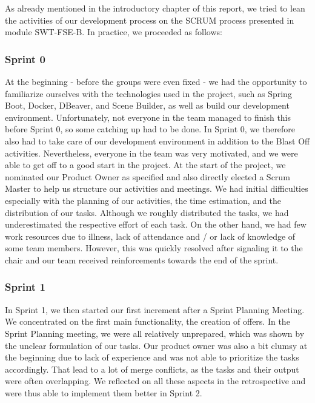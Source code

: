 As already mentioned in the introductory chapter of this report, we tried to lean the activities of our development process on the SCRUM process presented in module SWT-FSE-B.
In practice, we proceeded as follows:
\subsubsection{Sprint 0}
At the beginning - before the groups were even fixed - we had the opportunity to familiarize ourselves with the technologies used in the project, such as Spring Boot, Docker, DBeaver, and Scene Builder, as well as build our development environment.
Unfortunately, not everyone in the team managed to finish this before Sprint 0, so some catching up had to be done.
In Sprint 0, we therefore also had to take care of our development environment in addition to the Blast Off activities.
Nevertheless, everyone in the team was very motivated, and we were able to get off to a good start in the project.
    At the start of the project, we nominated our Product Owner as specified and also directly elected a Scrum Master to help us structure our activities and meetings.
We had initial difficulties especially with the planning of our activities, the time estimation, and the distribution of our tasks.
Although we roughly distributed the tasks, we had underestimated the respective effort of each task.
On the other hand, we had few work resources due to illness, lack of attendance and / or lack of knowledge of some team members.
However, this was quickly resolved after signaling it to the chair and our team received reinforcements towards the end of the sprint.

\subsubsection{Sprint 1}
    In Sprint 1, we then started our first increment after a Sprint Planning Meeting.
We concentrated on the first main functionality, the creation of offers.
In the Sprint Planning meeting, we were all relatively unprepared, which was shown by the unclear formulation of our tasks.
Our product owner was also a bit clumsy at the beginning due to lack of experience and was not able to prioritize the tasks accordingly.
That lead to a lot of merge conflicts, as the tasks and their output were often overlapping.
We reflected on all these aspects in the retrospective and were thus able to implement them better in Sprint 2.

